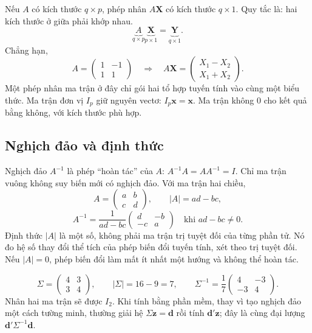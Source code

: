 Nếu $A$ có kích thước $q\times p$, phép nhân $A\mathbf X$ có kích thước
$q\times1$. Quy tắc là: hai kích thước ở giữa phải khớp nhau.
\[
 \underbrace{A}_{q\times p}
 \underbrace{\mathbf X}_{p\times1}
 =\underbrace{\mathbf Y}_{q\times1}.
\]
Chẳng hạn,
\[
 A=\begin{pmatrix}1&-1\\1&1\end{pmatrix}
 \quad\Longrightarrow\quad
 A\mathbf X=\begin{pmatrix}X_1-X_2\\X_1+X_2\end{pmatrix}.
\]
Một phép nhân ma trận ở đây chỉ gói hai tổ hợp tuyến tính vào cùng một biểu thức.
Ma trận đơn vị $I_p$ giữ nguyên vectơ: $I_p\mathbf x=\mathbf x$.
Ma trận không $0$ cho kết quả bằng không, với kích thước phù hợp.


\subsection{Nghịch đảo và định thức}
Nghịch đảo $A^{-1}$ là phép ``hoàn tác'' của $A$:
$A^{-1}A=AA^{-1}=I$. Chỉ ma trận vuông không suy biến mới có nghịch đảo.
Với ma trận hai chiều,
\[
 A=\begin{pmatrix}a&b\\c&d\end{pmatrix},\qquad
 |A|=ad-bc,
\]
\[
 A^{-1}=\frac1{ad-bc}\begin{pmatrix}d&-b\\-c&a\end{pmatrix}
 \quad\text{khi }ad-bc\ne0.
\]
Định thức $|A|$ là một số, không phải ma trận trị tuyệt đối của từng phần tử.
Nó đo hệ số thay đổi thể tích của phép biến đổi tuyến tính, xét theo trị tuyệt đối.
Nếu $|A|=0$, phép biến đổi làm mất ít nhất một hướng và không thể hoàn tác.

\begin{example}
\[
 \Sigma=\begin{pmatrix}4&3\\3&4\end{pmatrix},\qquad
 |\Sigma|=16-9=7,\qquad
 \Sigma^{-1}=\frac17\begin{pmatrix}4&-3\\-3&4\end{pmatrix}.
\]
Nhân hai ma trận sẽ được $I_2$. Khi tính bằng phần mềm, thay vì tạo nghịch đảo
một cách tường minh, thường giải hệ $\Sigma\mathbf z=\mathbf d$ rồi tính
$\mathbf d'\mathbf z$; đây là cùng đại lượng $\mathbf d'\Sigma^{-1}\mathbf d$.
\end{example}


